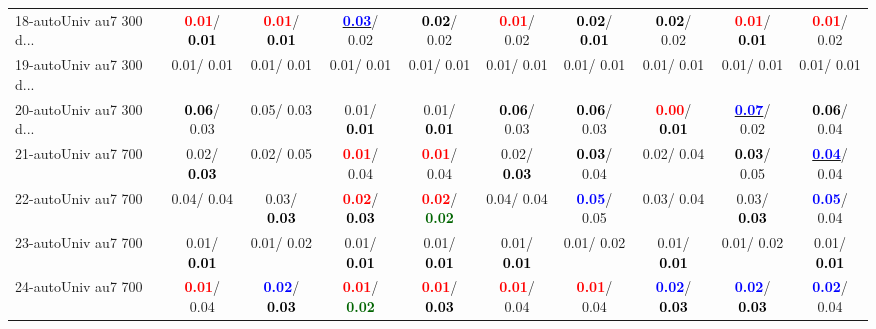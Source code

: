 \begin{table}[h]
\begin{center}
{\begin{tabular}{lc|c|c|c|c|c|c|c|c}
18-autoUniv au7 300 d... & \textcolor{red}{\textbf{  0.01}}/\textcolor{black}{\textbf{  0.01}} & \textcolor{red}{\textbf{  0.01}}/\textcolor{black}{\textbf{  0.01}} & \underline{\textcolor{blue}{\textbf{  0.03}}}/  0.02 & \textcolor{black}{\textbf{  0.02}}/  0.02 & \textcolor{red}{\textbf{  0.01}}/  0.02 & \textcolor{black}{\textbf{  0.02}}/\textcolor{black}{\textbf{  0.01}} & \textcolor{black}{\textbf{  0.02}}/  0.02 & \textcolor{red}{\textbf{  0.01}}/\textcolor{black}{\textbf{  0.01}} & \textcolor{red}{\textbf{  0.01}}/  0.02 \\
19-autoUniv au7 300 d... &   0.01/  0.01 &   0.01/  0.01 &   0.01/  0.01 &   0.01/  0.01 &   0.01/  0.01 &   0.01/  0.01 &   0.01/  0.01 &   0.01/  0.01 &   0.01/  0.01 \\
20-autoUniv au7 300 d... & \textcolor{black}{\textbf{  0.06}}/  0.03 &   0.05/  0.03 &   0.01/\textcolor{black}{\textbf{  0.01}} &   0.01/\textcolor{black}{\textbf{  0.01}} & \textcolor{black}{\textbf{  0.06}}/  0.03 & \textcolor{black}{\textbf{  0.06}}/  0.03 & \textcolor{red}{\textbf{  0.00}}/\textcolor{black}{\textbf{  0.01}} & \underline{\textcolor{blue}{\textbf{  0.07}}}/  0.02 & \textcolor{black}{\textbf{  0.06}}/  0.04 \\
21-autoUniv au7 700 &   0.02/\textcolor{black}{\textbf{  0.03}} &   0.02/  0.05 & \textcolor{red}{\textbf{  0.01}}/  0.04 & \textcolor{red}{\textbf{  0.01}}/  0.04 &   0.02/\textcolor{black}{\textbf{  0.03}} & \textcolor{black}{\textbf{  0.03}}/  0.04 &   0.02/  0.04 & \textcolor{black}{\textbf{  0.03}}/  0.05 & \underline{\textcolor{blue}{\textbf{  0.04}}}/  0.04 \\ \hline
22-autoUniv au7 700 &   0.04/  0.04 &   0.03/\textcolor{black}{\textbf{  0.03}} & \textcolor{red}{\textbf{  0.02}}/\textcolor{black}{\textbf{  0.03}} & \textcolor{red}{\textbf{  0.02}}/\textcolor{darkgreen}{\textbf{  0.02}} &   0.04/  0.04 & \textcolor{blue}{\textbf{  0.05}}/  0.05 &   0.03/  0.04 &   0.03/\textcolor{black}{\textbf{  0.03}} & \textcolor{blue}{\textbf{  0.05}}/  0.04 \\
23-autoUniv au7 700 &   0.01/\textcolor{black}{\textbf{  0.01}} &   0.01/  0.02 &   0.01/\textcolor{black}{\textbf{  0.01}} &   0.01/\textcolor{black}{\textbf{  0.01}} &   0.01/\textcolor{black}{\textbf{  0.01}} &   0.01/  0.02 &   0.01/\textcolor{black}{\textbf{  0.01}} &   0.01/  0.02 &   0.01/\textcolor{black}{\textbf{  0.01}} \\
24-autoUniv au7 700 & \textcolor{red}{\textbf{  0.01}}/  0.04 & \textcolor{blue}{\textbf{  0.02}}/\textcolor{black}{\textbf{  0.03}} & \textcolor{red}{\textbf{  0.01}}/\textcolor{darkgreen}{\textbf{  0.02}} & \textcolor{red}{\textbf{  0.01}}/\textcolor{black}{\textbf{  0.03}} & \textcolor{red}{\textbf{  0.01}}/  0.04 & \textcolor{red}{\textbf{  0.01}}/  0.04 & \textcolor{blue}{\textbf{  0.02}}/\textcolor{black}{\textbf{  0.03}} & \textcolor{blue}{\textbf{  0.02}}/\textcolor{black}{\textbf{  0.03}} & \textcolor{blue}{\textbf{  0.02}}/  0.04 \\

\end{tabular}}
\end{center}
\end{table}
